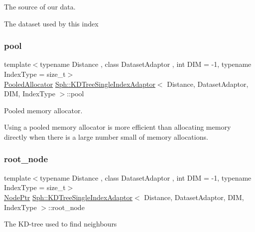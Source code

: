 The source of our data. 

The dataset used by this index \hypertarget{classSph_1_1KDTreeSingleIndexAdaptor_a0c3283516e497df16563c3e635ae4d29}{}\label{classSph_1_1KDTreeSingleIndexAdaptor_a0c3283516e497df16563c3e635ae4d29} 
\subsubsection{\texorpdfstring{pool}{pool}}
{\footnotesize\ttfamily template$<$typename Distance , class Dataset\+Adaptor , int D\+IM = -\/1, typename Index\+Type  = size\+\_\+t$>$ \\
\hyperlink{classSph_1_1PooledAllocator}{Pooled\+Allocator} \hyperlink{classSph_1_1KDTreeSingleIndexAdaptor}{Sph\+::\+K\+D\+Tree\+Single\+Index\+Adaptor}$<$ Distance, Dataset\+Adaptor, D\+IM, Index\+Type $>$\+::pool\hspace{0.3cm}{\ttfamily [protected]}}

Pooled memory allocator.

Using a pooled memory allocator is more efficient than allocating memory directly when there is a large number small of memory allocations. \hypertarget{classSph_1_1KDTreeSingleIndexAdaptor_ad50d49993d446a1ab158fc75d55a7bd5}{}\label{classSph_1_1KDTreeSingleIndexAdaptor_ad50d49993d446a1ab158fc75d55a7bd5} 
\subsubsection{\texorpdfstring{root\+\_\+node}{root\_node}}
{\footnotesize\ttfamily template$<$typename Distance , class Dataset\+Adaptor , int D\+IM = -\/1, typename Index\+Type  = size\+\_\+t$>$ \\
\hyperlink{structSph_1_1KDTreeSingleIndexAdaptor_1_1Node}{Node\+Ptr} \hyperlink{classSph_1_1KDTreeSingleIndexAdaptor}{Sph\+::\+K\+D\+Tree\+Single\+Index\+Adaptor}$<$ Distance, Dataset\+Adaptor, D\+IM, Index\+Type $>$\+::root\+\_\+node\hspace{0.3cm}{\ttfamily [protected]}}

The K\+D-\/tree used to find neighbours \hypertarget{classSph_1_1KDTreeSingleIndexAdaptor_a0a716f1a65f2d3f7984e8de05abae9ad}{}\label{classSph_1_1KDTreeSingleIndexAdaptor_a0a716f1a65f2d3f7984e8de05abae9ad} 
